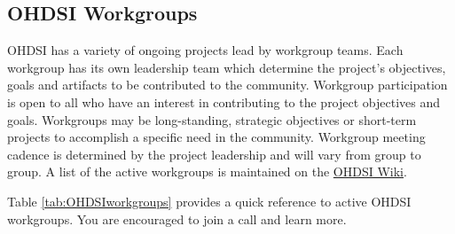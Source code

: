 \documentclass[11pt]{book}
\theoremstyle{definition}
\theoremstyle{definition}
\theoremstyle{definition}
\theoremstyle{remark}
\begin{document}
\hypertarget{ohdsi-workgroups}{%
\subsection{OHDSI Workgroups}\label{ohdsi-workgroups}}

OHDSI has a variety of ongoing projects lead by workgroup teams. Each workgroup has its own leadership team which determine the project's objectives, goals and artifacts to be contributed to the community. Workgroup participation is open to all who have an interest in contributing to the project objectives and goals. Workgroups may be long-standing, strategic objectives or short-term projects to accomplish a specific need in the community. Workgroup meeting cadence is determined by the project leadership and will vary from group to group. A list of the active workgroups is maintained on the \href{https://www.ohdsi.org/web/wiki/doku.php?id=projects:overview}{OHDSI Wiki}. 

Table \ref{tab:OHDSIworkgroups} provides a quick reference to active OHDSI workgroups. You are encouraged to join a call and learn more.
\end{document}
